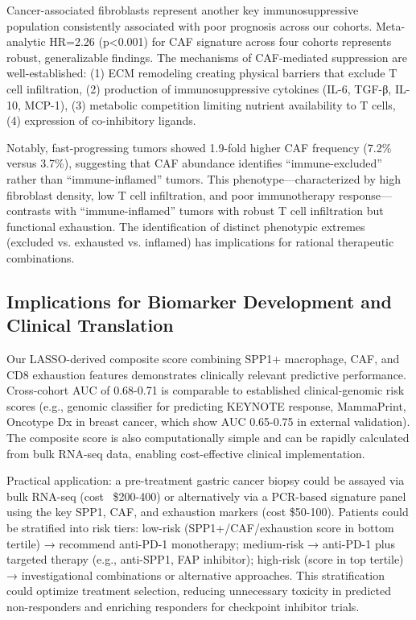\documentclass[12pt,twoside]{article}
\begin{document}
Cancer-associated fibroblasts represent another key immunosuppressive population consistently associated with poor prognosis across our cohorts. Meta-analytic HR=2.26 (p<0.001) for CAF signature across four cohorts represents robust, generalizable findings. The mechanisms of CAF-mediated suppression are well-established: (1) ECM remodeling creating physical barriers that exclude T cell infiltration, (2) production of immunosuppressive cytokines (IL-6, TGF-β, IL-10, MCP-1), (3) metabolic competition limiting nutrient availability to T cells, (4) expression of co-inhibitory ligands.

Notably, fast-progressing tumors showed 1.9-fold higher CAF frequency (7.2\% versus 3.7\%), suggesting that CAF abundance identifies ``immune-excluded'' rather than ``immune-inflamed'' tumors. This phenotype—characterized by high fibroblast density, low T cell infiltration, and poor immunotherapy response—contrasts with ``immune-inflamed'' tumors with robust T cell infiltration but functional exhaustion. The identification of distinct phenotypic extremes (excluded vs. exhausted vs. inflamed) has implications for rational therapeutic combinations.

\subsection{Implications for Biomarker Development and Clinical Translation}

Our LASSO-derived composite score combining SPP1+ macrophage, CAF, and CD8 exhaustion features demonstrates clinically relevant predictive performance. Cross-cohort AUC of 0.68-0.71 is comparable to established clinical-genomic risk scores (e.g., genomic classifier for predicting KEYNOTE response, MammaPrint, Oncotype Dx in breast cancer, which show AUC 0.65-0.75 in external validation). The composite score is also computationally simple and can be rapidly calculated from bulk RNA-seq data, enabling cost-effective clinical implementation.

Practical application: a pre-treatment gastric cancer biopsy could be assayed via bulk RNA-seq (cost ~\$200-400) or alternatively via a PCR-based signature panel using the key SPP1, CAF, and exhaustion markers (cost \$50-100). Patients could be stratified into risk tiers: low-risk (SPP1+/CAF/exhaustion score in bottom tertile) → recommend anti-PD-1 monotherapy; medium-risk → anti-PD-1 plus targeted therapy (e.g., anti-SPP1, FAP inhibitor); high-risk (score in top tertile) → investigational combinations or alternative approaches. This stratification could optimize treatment selection, reducing unnecessary toxicity in predicted non-responders and enriching responders for checkpoint inhibitor trials.
\end{document}
